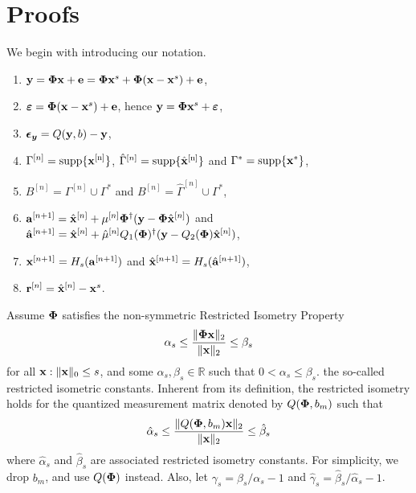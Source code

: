 \documentclass[article]{imsart}
\begin{document}
\section{Proofs}
We begin with introducing our notation.
\begin{enumerate}
    \item ${\bf y} = {\bf \Phi} {\bf x} + {\bf e} = {\bf \Phi} {\bf x}^s + {\bf \Phi}({\bf x}-{\bf x}^s) + {\bf e}$,
    \item $\boldsymbol{\varepsilon} = {\bf \Phi}({\bf x}-{\bf x}^s) + {\bf e}$, hence ${\bf y} = {\bf \Phi} {\bf x}^s + \boldsymbol{\varepsilon}$,
    \item $\boldsymbol{\epsilon_y} = Q({\bf y},b) - {\bf y}$,
    \item $\Gamma^{[n]} = \rm{supp}\{{\bf x}^{[n]} \}$, $\hat{\Gamma}^{[n]} = \rm{supp}\{\hat{{\bf x}}^{[n]} \}$ and $\Gamma^{*} = \rm{supp}\{{\bf x}^{*} \}$,
    \item $B^{[n]} = \Gamma^{[n]} \cup \Gamma^{*}$ and $B^{[n]} = \hat{\Gamma}^{[n]} \cup \Gamma^{*}$,
    \item ${\bf a}^{[n+1]} = \hat{{\bf x}}^{[n]} + \mu^{[n]}{\bf \Phi}^{\dag}({\bf y} - {\bf \Phi}\hat{{\bf x}}^{[n]})$ and $\hat{{\bf a}}^{[n+1]} = \hat{{\bf x}}^{[n]} + \hat{\mu}^{[n]}Q_{1}({\bf \Phi})^{\dag}({\bf y} - Q_2({\bf \Phi})\hat{{\bf x}}^{[n]})$,
    \item ${\bf x}^{[n+1]} = H_s({\bf a}^{[n+1]})$ and $\hat{{\bf x}}^{[n+1]} = H_s(\hat{{\bf a}}^{[n+1]})$,
    \item ${\bf r}^{[n]} = \hat{{\bf x}}^{[n]}-{\bf x}^s$.
\end{enumerate}
Assume $\mathbf{\bf \Phi}$ satisfies the non-symmetric Restricted Isometry Property 
\begin{equation}\label{rip}
\alpha_{s} \leq \frac{\|{\bf {\bf \Phi}} {\bf x}\|_2}{\|{\bf x}\|_2} \leq \beta_{s}
\end{equation}
for all ${\bf x}: \|{\bf x}\|_0 \leq s$, and some $\alpha_s, \beta_s \in \mathbb{R}$ such that $0<\alpha_s\leq \beta_s$. the so-called restricted isometric constants. Inherent from its definition, the restricted isometry holds for the quantized measurement matrix denoted by $Q({\bf {\bf \Phi}}, b_m)$ such that
\begin{equation}\label{rip_lowprecision}
\hat{\alpha}_{s} \leq \frac{\|Q({\bf {\bf \Phi}}, b_m) {\bf x}\|_2}{\|{\bf x}\|_2} \leq \hat{\beta}_{s}
\end{equation}
where $\hat{\alpha}_{s}$ and $\hat{\beta}_{s}$ are associated restricted isometry constants. For simplicity, we drop $b_m$, and use $Q({\bf {\bf \Phi}})$ instead. Also, let $\gamma_s=\beta_s/\alpha_s-1$ and $\hat{\gamma}_s=\hat{\beta}_s/\hat{\alpha}_s-1$.
\end{document}
